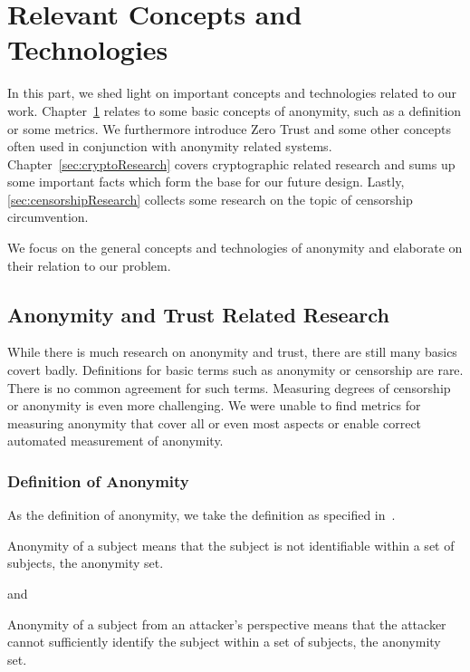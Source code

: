 
\part{Relevant Concepts and Technologies}\label{sec:concepts}
In this part, we shed light on important concepts and technologies related to our work. Chapter~\ref{sec:anontrustResearch} relates to some basic concepts of anonymity, such as a definition or some metrics. We furthermore introduce Zero Trust and some other concepts often used in conjunction with anonymity related systems. Chapter~\ref{sec:cryptoResearch} covers cryptographic related research and sums up some important facts which form the base for our future design. Lastly, \cref{sec:censorshipResearch} collects some research on the topic of censorship circumvention.

We focus on the general concepts and technologies of anonymity and elaborate on their relation to our problem.

\chapter{Anonymity and Trust Related Research}\label{sec:anontrustResearch}
While there is much research on anonymity and trust, there are still many basics covert badly. Definitions for basic terms such as anonymity or censorship are rare. There is no common agreement for such terms. Measuring degrees of censorship or anonymity is even more challenging. We were unable to find metrics for measuring anonymity that cover all or even most aspects or enable correct automated measurement of anonymity.

\section{Definition of Anonymity}
As the definition of anonymity, we take the definition as specified in~\cite{anonTerminology}.
\begin{shadequote}{}
	Anonymity of a subject means that the subject is not identifiable within a set of subjects, the anonymity set.\omitted
\end{shadequote}
and
\begin{shadequote}{}
	Anonymity of a subject from an attacker's perspective means that the attacker cannot sufficiently identify the subject within a set of subjects, the anonymity set.\omitted
\end{shadequote}

